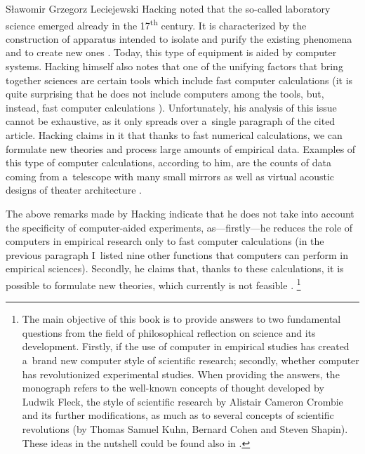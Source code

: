 \begin{artengenv}{Sławomir Grzegorz Leciejewski}
Hacking noted that the so-called laboratory science emerged already in the 17\textsuperscript{th} century. It is characterized by the construction of apparatus intended to isolate and purify the existing phenomena and to create new ones 
\parencite[][]{hacking_disunities_1996}. %
 Today, this type of equipment is aided by computer systems. Hacking himself also notes that one of the unifying factors that bring together sciences are certain tools which include fast computer calculations (it is quite surprising that he does not include computers among the tools, but, instead, fast computer calculations 
\parencite[][]{hacking_disunities_1996}%
). Unfortunately, his analysis of this issue cannot be exhaustive, as it only spreads over a~single paragraph of the cited article. Hacking claims in it that thanks to fast numerical calculations, we can formulate new theories and process large amounts of empirical data. Examples of this type of computer calculations, according to him, are the counts of data coming from a~telescope with many small mirrors as well as virtual acoustic designs of theater architecture 
\parencite[][]{hacking_disunities_1996}.%




The above remarks made by Hacking indicate that he does not take into account the specificity of computer-aided experiments, as---firstly---he reduces the role of computers in empirical research only to fast computer calculations (in the previous paragraph I~listed nine other functions that computers can perform in empirical sciences). Secondly, he claims that, thanks to these calculations, it is possible to formulate new theories, which currently is not feasible 
\parencite[][pp.86–93]{leciejewski_cyfrowa_2013}.%
\footnote{The main objective of this book is to provide answers to two fundamental questions from the field of philosophical reflection on science and its development. Firstly, if the use of computer in empirical studies has created a~brand new computer style of scientific research; secondly, whether computer has revolutionized experimental studies. When providing the answers, the monograph refers to the well-known concepts of thought developed by Ludwik Fleck, the style of scientific research by Alistair Cameron Crombie and its further modifications, as much as to several concepts of scientific revolutions (by Thomas Samuel Kuhn, Bernard Cohen and Steven Shapin). These ideas in the nutshell could be found also in 
\parencite[][]{leciejewski_struktura_2018}.%
}




\end{artengenv}
